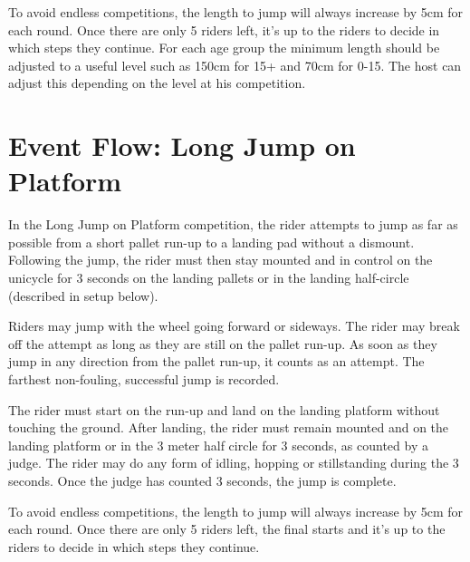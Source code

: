 To avoid endless competitions, the length to jump will always increase by 5cm for each round.
Once there are only 5 riders left, it's up to the riders to decide in which steps they continue.
For each age group the minimum length should be adjusted to a useful level such as 150cm for 15+ and 70cm for 0-15.
The host can adjust this depending on the level at his competition.

\section{Event Flow: Long Jump on Platform}
In the Long Jump on Platform competition, the rider attempts to jump as far as possible from a short pallet run-up to a landing pad without a dismount.
Following the jump, the rider must then stay mounted and in control on the unicycle for 3 seconds on the landing pallets or in the landing half-circle (described in setup below).

Riders may jump with the wheel going forward or sideways.
The rider may break off the attempt as long as they are still on the pallet run-up.
As soon as they jump in any direction from the pallet run-up, it counts as an attempt.
The farthest non-fouling, successful jump is recorded.

The rider must start on the run-up and land on the landing platform without touching the ground.
After landing, the rider must remain mounted and on the landing platform or in the 3 meter half circle for 3 seconds, as counted by a judge.
The rider may do any form of idling, hopping or stillstanding during the 3 seconds.
Once the judge has counted 3 seconds, the jump is complete.

To avoid endless competitions, the length to jump will always increase by 5cm for each round.
Once there are only 5 riders left, the final starts and it’s up to the riders to decide in which steps they continue. 

